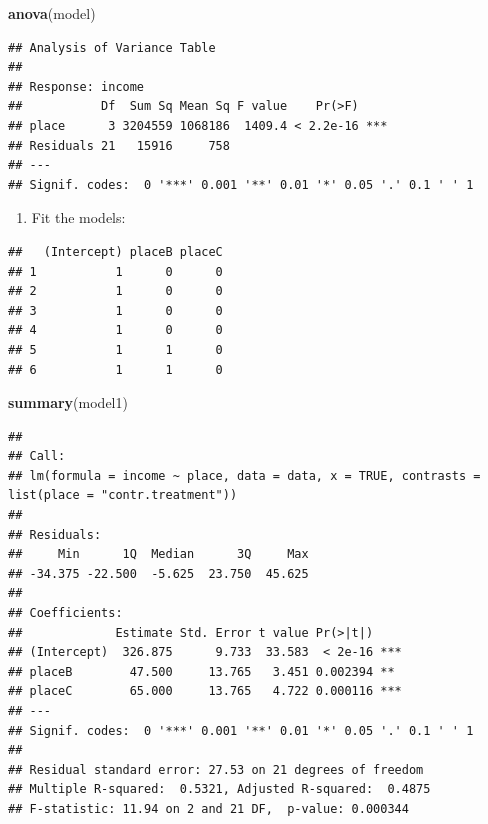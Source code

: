 \documentclass[
]{article}
\newenvironment{Shaded}{\begin{snugshade}}{\end{snugshade}}
\newcommand{\AttributeTok}[1]{\textcolor[rgb]{0.13,0.29,0.53}{#1}}
\newcommand{\ConstantTok}[1]{\textcolor[rgb]{0.56,0.35,0.01}{#1}}
\newcommand{\FunctionTok}[1]{\textcolor[rgb]{0.13,0.29,0.53}{\textbf{#1}}}
\newcommand{\NormalTok}[1]{#1}
\newcommand{\OtherTok}[1]{\textcolor[rgb]{0.56,0.35,0.01}{#1}}
\newcommand{\SpecialCharTok}[1]{\textcolor[rgb]{0.81,0.36,0.00}{\textbf{#1}}}
\newcommand{\StringTok}[1]{\textcolor[rgb]{0.31,0.60,0.02}{#1}}
\providecommand{\tightlist}{%
  \setlength{\itemsep}{0pt}\setlength{\parskip}{0pt}}
\begin{document}
\begin{Shaded}
\begin{Highlighting}[]
\FunctionTok{anova}\NormalTok{(model)}
\end{Highlighting}
\end{Shaded}

\begin{verbatim}
## Analysis of Variance Table
## 
## Response: income
##           Df  Sum Sq Mean Sq F value    Pr(>F)    
## place      3 3204559 1068186  1409.4 < 2.2e-16 ***
## Residuals 21   15916     758                      
## ---
## Signif. codes:  0 '***' 0.001 '**' 0.01 '*' 0.05 '.' 0.1 ' ' 1
\end{verbatim}

\begin{enumerate}
\def\labelenumi{\arabic{enumi}.}
\setcounter{enumi}{2}
\tightlist
\item
  Fit the models:
\end{enumerate}

\begin{Shaded}
\end{Shaded}

\begin{verbatim}
##   (Intercept) placeB placeC
## 1           1      0      0
## 2           1      0      0
## 3           1      0      0
## 4           1      0      0
## 5           1      1      0
## 6           1      1      0
\end{verbatim}

\begin{Shaded}
\begin{Highlighting}[]
\FunctionTok{summary}\NormalTok{(model1)}
\end{Highlighting}
\end{Shaded}

\begin{verbatim}
## 
## Call:
## lm(formula = income ~ place, data = data, x = TRUE, contrasts = list(place = "contr.treatment"))
## 
## Residuals:
##     Min      1Q  Median      3Q     Max 
## -34.375 -22.500  -5.625  23.750  45.625 
## 
## Coefficients:
##             Estimate Std. Error t value Pr(>|t|)    
## (Intercept)  326.875      9.733  33.583  < 2e-16 ***
## placeB        47.500     13.765   3.451 0.002394 ** 
## placeC        65.000     13.765   4.722 0.000116 ***
## ---
## Signif. codes:  0 '***' 0.001 '**' 0.01 '*' 0.05 '.' 0.1 ' ' 1
## 
## Residual standard error: 27.53 on 21 degrees of freedom
## Multiple R-squared:  0.5321, Adjusted R-squared:  0.4875 
## F-statistic: 11.94 on 2 and 21 DF,  p-value: 0.000344
\end{verbatim}
\end{document}
